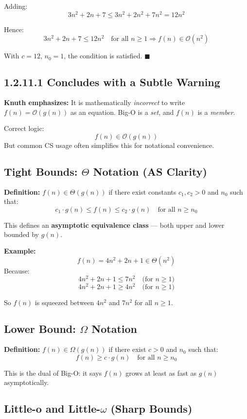 \documentclass{article}
\begin{document}
Adding:
\[
3n^2 + 2n + 7 \le 3n^2 + 2n^2 + 7n^2 = 12n^2
\]

Hence:
\[
3n^2 + 2n + 7 \le 12n^2 \quad \text{for all } n \ge 1
\Rightarrow f(n) \in \mathcal{O}(n^2)
\]

With $c = 12$, $n_0 = 1$, the condition is satisfied. $\blacksquare$

\subsection*{1.2.11.1 Concludes with a Subtle Warning}

\textbf{Knuth emphasizes:} It is mathematically \textit{incorrect} to write $f(n) = \mathcal{O}(g(n))$ as an equation. Big-O is a \textit{set}, and $f(n)$ is a \textit{member}.

Correct logic:
\[
f(n) \in \mathcal{O}(g(n))
\]
But common CS usage often simplifies this for notational convenience.

\subsection*{Tight Bounds: $\Theta$ Notation (AS Clarity)}

\textbf{Definition:} $f(n) \in \Theta(g(n))$ if there exist constants $c_1, c_2 > 0$ and $n_0$ such that:
\[
c_1 \cdot g(n) \le f(n) \le c_2 \cdot g(n) \quad \text{for all } n \ge n_0
\]

This defines an \textbf{asymptotic equivalence class} — both upper and lower bounded by $g(n)$.

\textbf{Example:}
\[
f(n) = 4n^2 + 2n + 1 \in \Theta(n^2)
\]
Because:
\[
4n^2 + 2n + 1 \le 7n^2 \quad \text{(for } n \ge 1)
\]
\[
4n^2 + 2n + 1 \ge 4n^2 \quad \text{(for } n \ge 1)
\]

So $f(n)$ is squeezed between $4n^2$ and $7n^2$ for all $n \ge 1$.

\subsection*{Lower Bound: $\Omega$ Notation}

\textbf{Definition:} $f(n) \in \Omega(g(n))$ if there exist $c > 0$ and $n_0$ such that:
\[
f(n) \ge c \cdot g(n) \quad \text{for all } n \ge n_0
\]

This is the dual of Big-O: it says $f(n)$ grows at least as fast as $g(n)$ asymptotically.

\subsection*{Little-o and Little-$\omega$ (Sharp Bounds)}
\end{document}
